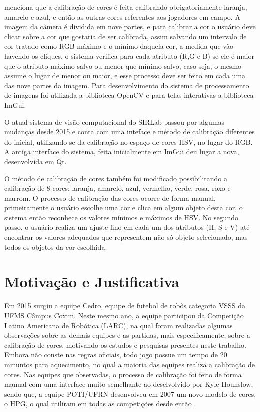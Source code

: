  menciona que a calibração de cores é feita calibrando obrigatoriamente laranja, amarelo e azul, e então as outras cores referentes aos jogadores em campo. A imagem da câmera é dividida em nove partes, e para calibrar a cor o usuário deve clicar sobre a cor que gostaria de ser calibrada, assim salvando um intervalo de cor tratado como RGB máximo e o mínimo daquela cor, a medida
que vão havendo os cliques, o sistema verifica para cada atributo (R,G e B) se ele é maior que o atributo
máximo salvo ou menor que mínimo salvo, caso seja, o mesmo assume o lugar de menor ou
maior, e esse processo deve ser feito em cada uma das nove partes da imagem. 
Para desenvolvimento do sistema de processamento de imagens foi utilizada a biblioteca OpenCV e para telas interativas a biblioteca ImGui.

O atual sistema de visão computacional do SIRLab passou por algumas mudanças desde 2015 e conta com uma inteface e método de calibração diferentes do inicial, utilizando-se da calibração no espaço de cores HSV, no lugar do RGB. A antiga interface do sistema, feita inicialmente em ImGui deu lugar a nova, desenvolvida em Qt\cite{VSSVision}.

O método de calibração de cores também foi modificado possibilitando a calibração de 8 cores: laranja, amarelo, azul, vermelho, verde, rosa, roxo e marrom\cite{VSSVision}. O processo de calibração das cores ocorre de forma manual, primeiramente o usuário escolhe uma cor e clica em algum objeto desta cor, o sistema então reconhece os valores  mínimos e máximos de HSV. No segundo passo, o usuário realiza um ajuste fino em cada um dos atributos (H, S e V) até encontrar os valores adequados que representem não só objeto selecionado, mas todos os objetos da cor escolhida.

\section{Motivação e Justificativa}
Em 2015 surgiu a equipe Cedro, equipe de futebol de robôs categoria VSSS da UFMS Câmpus Coxim. Neste mesmo ano, a equipe participou da Competição Latino Americana de Robótica (LARC), na qual foram realizadas algumas observações sobre as demais equipes e as partidas, mais especificamente, sobre a calibração de cores, motivando os estudos e pesquisas presentes neste trabalho. Embora não conste nas regras oficiais, todo jogo possue um tempo de 20 minuntos para aquecimento, no qual a maioria das equipes realiza a calibração de cores. Nas equipes que observadas, o processo de calibração foi feito de forma manual com uma interface muito semelhante ao deselvolvido por Kyle Hounslow\cite{YouTube}, sendo que, a equipe POTI/UFRN desenvolveu em 2007 um novo modelo de cores, o HPG, o qual utiliram em todas as competições desde então  \cite{Martins:2007,Mendes:2008,Mendes:2009}.

